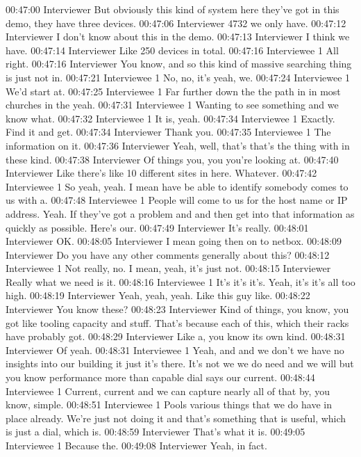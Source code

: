 00:47:00 Interviewer
But obviously this kind of system here they've got in this demo, they have three devices.
00:47:06 Interviewer
4732 we only have.
00:47:12 Interviewer
I don't know about this in the demo.
00:47:13 Interviewer
I think we have.
00:47:14 Interviewer
Like 250 devices in total.
00:47:16 Interviewee 1
All right.
00:47:16 Interviewer
You know, and so this kind of massive searching thing is just not in.
00:47:21 Interviewee 1
No, no, it's yeah, we.
00:47:24 Interviewee 1
We'd start at.
00:47:25 Interviewee 1
Far further down the the path in in most churches in the yeah.
00:47:31 Interviewee 1
Wanting to see something and we know what.
00:47:32 Interviewee 1
It is, yeah.
00:47:34 Interviewee 1
Exactly. Find it and get.
00:47:34 Interviewer
Thank you.
00:47:35 Interviewee 1
The information on it.
00:47:36 Interviewer
Yeah, well, that's that's the thing with in these kind.
00:47:38 Interviewer
Of things you, you you're looking at.
00:47:40 Interviewer
Like there's like 10 different sites in here. Whatever.
00:47:42 Interviewee 1
So yeah, yeah. I mean have be able to identify somebody comes to us with a.
00:47:48 Interviewee 1
People will come to us for the host name or IP address. Yeah. If they've got a problem and and then get into that information as quickly as possible. Here's our.
00:47:49 Interviewer
It's really.
00:48:01 Interviewer
OK.
00:48:05 Interviewer
I mean going then on to netbox.
00:48:09 Interviewer
Do you have any other comments generally about this?
00:48:12 Interviewee 1
Not really, no. I mean, yeah, it's just not.
00:48:15 Interviewer
Really what we need is it.
00:48:16 Interviewee 1
It's it's it's. Yeah, it's it's all too high.
00:48:19 Interviewer
Yeah, yeah, yeah. Like this guy like.
00:48:22 Interviewer
You know these?
00:48:23 Interviewer
Kind of things, you know, you got like tooling capacity and stuff. That's because each of this, which their racks have probably got.
00:48:29 Interviewer
Like a, you know its own kind.
00:48:31 Interviewer
Of yeah.
00:48:31 Interviewee 1
Yeah, and and we don't we have no insights into our building it just it's there. It's not we we do need and we will but you know performance more than capable dial says our current.
00:48:44 Interviewee 1
Current, current and we can capture nearly all of that by, you know, simple.
00:48:51 Interviewee 1
Pools various things that we do have in place already. We're just not doing it and that's something that is useful, which is just a dial, which is.
00:48:59 Interviewer
That's what it is.
00:49:05 Interviewee 1
Because the.
00:49:08 Interviewer
Yeah, in fact.
